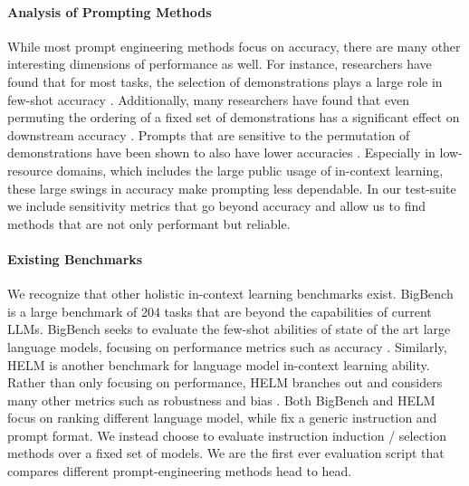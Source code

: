 \paragraph{Analysis of Prompting Methods} While most prompt engineering methods focus on accuracy, there are many other interesting dimensions of performance as well. For instance, researchers have found that for most tasks, the selection of demonstrations plays a large role in few-shot accuracy \cite{whatmakesgoodicexamples, selectionmachinetranslation, knnprompting}. Additionally, many researchers have found that even permuting the ordering of a fixed set of demonstrations has a significant effect on downstream accuracy \cite{fantasticallyorderedprompts}. Prompts that are sensitive to the permutation of demonstrations have been shown to also have lower accuracies \cite{relationsensitivityaccuracy}. Especially in low-resource domains, which includes the large public usage of in-context learning, these large swings in accuracy make prompting less dependable. In our test-suite we include sensitivity metrics that go beyond accuracy and allow us to find methods that are not only performant but reliable.

\paragraph{Existing Benchmarks} We recognize that other holistic in-context learning benchmarks exist. BigBench is a large benchmark of 204 tasks that are beyond the capabilities of current LLMs. BigBench seeks to evaluate the few-shot abilities of state of the art large language models, focusing on performance metrics such as accuracy \cite{bigbench}. Similarly, HELM is another benchmark for language model in-context learning ability. Rather than only focusing on performance, HELM branches out and considers many other metrics such as robustness and bias \cite{helm}. Both BigBench and HELM focus on ranking different language model, while fix a generic instruction and prompt format. We instead choose to evaluate instruction induction / selection methods over a fixed set of models. We are the first ever evaluation script that compares different prompt-engineering methods head to head. 
\fi

